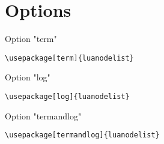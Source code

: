 \documentclass{article}
\begin{document}
\section{Options}

Option "term"

\begin{lstlisting}
\usepackage[term]{luanodelist}
\end{lstlisting}

Option "log"

\begin{lstlisting}
\usepackage[log]{luanodelist}
\end{lstlisting}

Option "termandlog"

\begin{lstlisting}
\usepackage[termandlog]{luanodelist}
\end{lstlisting}
\end{document}
